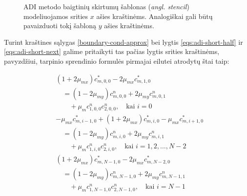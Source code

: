 \begin{figure}[h!]
  \centering
  \caption{ADI metodo baigtinių skirtumų šablonas (\textit{angl. stencil}) modeliuojamos srities $x$ ašies kraštinėms. Analogiškai gali būtų pavaizduoti tokį šabloną $y$ ašies kraštinėms. }
  \label{fig:ghost-points}
\end{figure}
Turint kraštines sąlygas \eqref{boundary-cond-approx} bei lygtis \eqref{eqs:adi-short-half} ir \eqref{eqs:adi-short-next} galime pritaikyti tas pačias lygtis srities kraštinėms, pavyzdžiui, tarpinio sprendinio formulės pirmajai eilutei atrodytų štai taip:

\begin{align*}
  & (1 + 2\mu_{mx})c^{*}_{m,0,0} - 2\mu_{mx}c^{*}_{m,1,0} \\
  & \quad = (1 - 2\mu_{my})c^n_{m,0,0} + 2\mu_{my}c^n_{m,0,1} \\
  & \qquad + \mu_m c^n_{1,0,0}c^n_{2,0,0}, \quad \text{kai } i = 0 \\[1.5ex]
  & -\mu_{mx}c^{*}_{m,i-1,0} + (1 + 2\mu_{mx})c^{*}_{m,i,0} - \mu_{mx}c^{*}_{m,i+1,0} \\
  & \quad = (1 - 2\mu_{my})c^n_{m,i,0} + 2\mu_{my}c^n_{m,i,1} \\
  & \qquad + \mu_m c^n_{1,i,0}c^n_{2,i,0}, \quad \text{kai } i = 1, 2, \dots, N-2 \\[1.5ex]
  & (1 + 2\mu_{mx})c^{*}_{m,N-1,0} - 2\mu_{mx}c^{*}_{m,N-2,0} \\
  & \quad = (1 - 2\mu_{my})c^n_{m,N-1,0} + 2\mu_{my}c^n_{m,N-1,1} \\
  & \qquad + \mu_m c^n_{1,N-1,0}c^n_{2,N-1,0}, \quad \text{kai } i = N-1
\end{align*}


